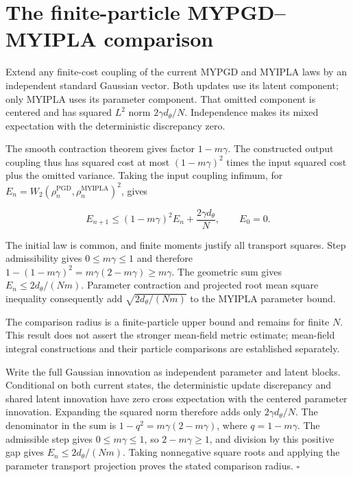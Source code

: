 \documentclass[11pt,a4paper]{report}
\begin{document}
\section{\texorpdfstring{The finite-particle MYPGD–MYIPLA comparison}{The finite-particle MYPGD–MYIPLA comparison}}



Extend any finite-cost coupling of the current MYPGD and MYIPLA laws by an independent standard Gaussian vector. Both updates use its latent component; only MYIPLA uses its parameter component. That omitted component is centered and has squared \(L^2\) norm \(2\gamma d_\theta/N\). Independence makes its mixed expectation with the deterministic discrepancy zero.



The smooth contraction theorem \cite[Section~3.10.7]{LangevinLean2026ULASC} gives factor \(1-m\gamma\). The constructed output coupling thus has squared cost at most \((1-m\gamma)^2\) times the input squared cost plus the omitted variance. Taking the input coupling infimum, for \(E_n=W_2(\rho_n^{\mathrm{PGD}},\rho_n^{\mathrm{MYIPLA}})^2\), gives

\[E_{n+1}\le(1-m\gamma)^2E_n+\frac{2\gamma d_\theta}{N},\qquad E_0=0.\]

The initial law is common, and finite moments justify all transport squares. Step admissibility gives \(0\le m\gamma\le1\) and therefore \(1-(1-m\gamma)^2=m\gamma(2-m\gamma)\ge m\gamma\). The geometric sum gives \(E_n\le2d_\theta/(Nm)\). Parameter contraction \cite[Section~3.1.6]{LangevinLean2026IPLA} and projected root mean square inequality \cite[Section~3.48.9]{LangevinLean2026ULASC} consequently add \(\sqrt{2d_\theta/(Nm)}\) to the MYIPLA parameter bound.



The comparison radius is a finite-particle upper bound and remains for finite \(N\). This result does not assert the stronger mean-field metric estimate; mean-field integral constructions and their particle comparisons are established separately.




Write the full Gaussian innovation as independent parameter and latent blocks. Conditional on both current states, the deterministic update discrepancy and shared latent innovation have zero cross expectation with the centered parameter innovation. Expanding the squared norm therefore adds only \(2\gamma d_\theta/N\). The denominator in the sum is \(1-q^2=m\gamma(2-m\gamma)\), where \(q=1-m\gamma\). The admissible step gives \(0\le m\gamma\le1\), so \(2-m\gamma\ge1\), and division by this positive gap gives \(E_n\le2d_\theta/(Nm)\). Taking nonnegative square roots and applying the parameter transport projection proves the stated comparison radius. \(\square\)
\end{document}
